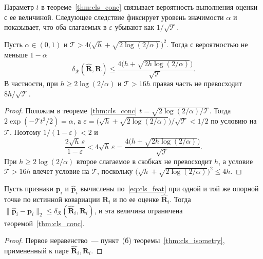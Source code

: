 Параметр $t$ в теореме~\ref{thm:cls_conc} связывает вероятность выполнения оценки с ее величиной. Следующее следствие фиксирует уровень значимости $\alpha$ и показывает, что оба слагаемых в $\varepsilon$ убывают как $1/\sqrt{\mathcal{T}}$.

\begin{corollary}\label{cor:cls_rate}
Пусть $\alpha \in (0,1)$ и $\mathcal{T} > 4\big(\sqrt{h} + \sqrt{2\log(2/\alpha)}\big)^2$. Тогда с вероятностью не меньше $1-\alpha$
\begin{equation}\label{eq:cls_rate}
\delta_{\mathcal{R}}(\hat{\mathbf{R}}, \mathbf{R}) \leqslant \frac{4\big(h + \sqrt{2h\log(2/\alpha)}\big)}{\sqrt{\mathcal{T}}} .
\end{equation}
В частности, при $h \geqslant 2\log(2/\alpha)$ и $\mathcal{T} > 16h$ правая часть не превосходит $8h/\sqrt{\mathcal{T}}$.
\end{corollary}
\begin{proof}
Положим в теореме~\ref{thm:cls_conc} $t = \sqrt{2\log(2/\alpha)/\mathcal{T}}$. Тогда $2\exp(-\mathcal{T}t^2/2) = \alpha$, а $\varepsilon = \big(\sqrt{h} + \sqrt{2\log(2/\alpha)}\big)/\sqrt{\mathcal{T}} < 1/2$ по условию на $\mathcal{T}$. Поэтому $1/(1-\varepsilon) < 2$ и
\begin{equation*}
\frac{2\sqrt{h}\,\varepsilon}{1-\varepsilon} < 4\sqrt{h}\,\varepsilon = \frac{4\big(h + \sqrt{2h\log(2/\alpha)}\big)}{\sqrt{\mathcal{T}}} .
\end{equation*}
При $h \geqslant 2\log(2/\alpha)$ второе слагаемое в скобках не превосходит $h$, а условие $\mathcal{T} > 16h$ влечет условие на $\mathcal{T}$, поскольку $\big(\sqrt{h} + \sqrt{2\log(2/\alpha)}\big)^2 \leqslant 4h$.
\end{proof}

\begin{corollary}\label{cor:cls_stab}
Пусть признаки $\mathbf{p}_i$ и $\hat{\mathbf{p}}_i$ вычислены по~\eqref{eq:cls_feat} при одной и той же опорной точке по истинной ковариации $\mathbf{R}_i$ и по ее оценке $\hat{\mathbf{R}}_i$. Тогда $\|\hat{\mathbf{p}}_i - \mathbf{p}_i\|_2 \leqslant \delta_{\mathcal{R}}(\hat{\mathbf{R}}_i, \mathbf{R}_i)$, и эта величина ограничена теоремой~\ref{thm:cls_conc}.
\end{corollary}
\begin{proof}
Первое неравенство~--- пункт~(б) теоремы~\ref{thm:cls_isometry}, примененный к паре $\hat{\mathbf{R}}_i, \mathbf{R}_i$.
\end{proof}

